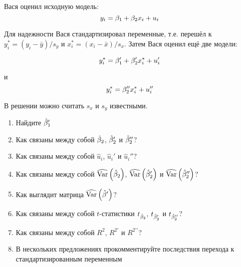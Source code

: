\documentclass[pdftex,11pt,openany]{book}\usepackage[]{graphicx}\usepackage[]{color}
\begin{document}
\begin{problem}
Вася оценил исходную модель:
\[
y_i=\beta_1+\beta_2 x_i + u_i
\]

Для надежности Вася стандартизировал переменные, т.е. перешёл к $y_i^*=(y_i-\bar{y})/s_y$ и $x_i^*=(x_i-\bar{x})/s_x$. Затем Вася оценил ещё две модели:

\[
y_i^*=\beta_1'+\beta_2' x^*_i + u_i'
\]

и 
\[
y_i^*=\beta_2'' x^*_i + u_i''
\]

В решении можно считать $s_x$ и $s_y$ известными.
 
\begin{enumerate}
\item Найдите $\hat{\beta}_1'$
\item Как связаны между собой $\hat{\beta}_2$, $\hat{\beta}_2'$ и $\hat{\beta}_2''$? 
\item Как связаны между собой $\hat{u}_i$, $\hat{u}_i'$ и $\hat{u}_i''$?
\item Как связаны между собой $\widehat{\operatorname{Var}}\left(\hat{\beta}_2\right)$, $\widehat{\operatorname{Var}}\left(\hat{\beta}_2'\right)$ и $\widehat{\operatorname{Var}}\left(\hat{\beta}_2''\right)$?
\item Как выглядит матрица $\widehat{\operatorname{Var}}\left(\hat{\beta}'\right)$?
\item Как связаны между собой $t$-статистики $t_{\hat{\beta}_2}$, $t_{\hat{\beta}_2'}$ и $t_{\hat{\beta}_2''}$?
\item Как связаны между собой $R^2$, $R^{2\prime}$ и $R^{2\prime\prime}$?
\item В нескольких предложениях прокомментируйте последствия перехода к стандартизированным переменным
\end{enumerate}
\end{problem}
\begin{solution}
\end{solution}
\end{document}
